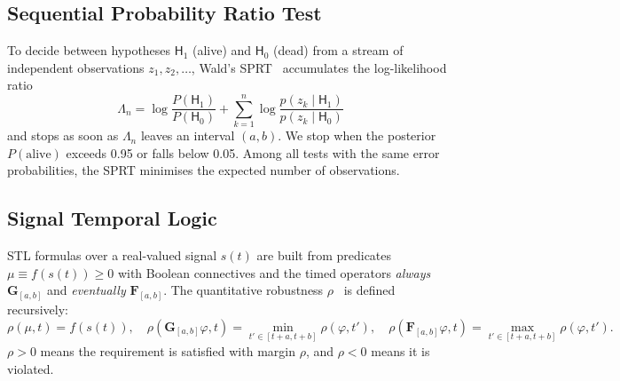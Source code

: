 \subsection{Sequential Probability Ratio Test}

To decide between hypotheses $\mathsf{H}_1$ (alive) and $\mathsf{H}_0$ (dead) from a stream of independent observations
$z_1,z_2,\dots$, Wald's SPRT~\citep{Wald1945} accumulates the log-likelihood ratio
\begin{equation}
    \Lambda_n = \log\frac{P(\mathsf{H}_1)}{P(\mathsf{H}_0)} + \sum_{k=1}^{n}\log\frac{p(z_k\mid\mathsf{H}_1)}{p(z_k\mid\mathsf{H}_0)}
\end{equation}
and stops as soon as $\Lambda_n$ leaves an interval $(a,b)$. We stop when the posterior $P(\text{alive})$ exceeds 0.95
or falls below 0.05. Among all tests with the same error probabilities, the SPRT minimises the expected number of
observations.

\subsection{Signal Temporal Logic}

STL formulas over a real-valued signal $s(t)$ are built from predicates $\mu \equiv f(s(t))\ge 0$ with Boolean
connectives and the timed operators \emph{always} $\mathbf{G}_{[a,b]}$ and \emph{eventually} $\mathbf{F}_{[a,b]}$. The
quantitative robustness $\rho$~\citep{Donze2010} is defined recursively:
\begin{equation}
    \rho(\mu,t)=f(s(t)),\quad \rho(\mathbf{G}_{[a,b]}\varphi,t)=\min_{t'\in[t+a,t+b]}\rho(\varphi,t'),\quad
    \rho(\mathbf{F}_{[a,b]}\varphi,t)=\max_{t'\in[t+a,t+b]}\rho(\varphi,t').
\end{equation}
$\rho>0$ means the requirement is satisfied with margin $\rho$, and $\rho<0$ means it is violated.

